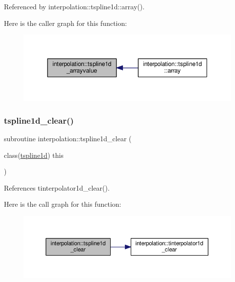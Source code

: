 Referenced by interpolation\+::tspline1d\+::array().

Here is the caller graph for this function\+:
\nopagebreak
\begin{figure}[H]
\begin{center}
\leavevmode
\includegraphics[width=344pt]{namespaceinterpolation_a1bb0d4fae1b5125618e2e9f67669bd3c_icgraph}
\end{center}
\end{figure}
\mbox{\label{namespaceinterpolation_ab31f5a781a449692250e4a0ab0ec432c}} 
\subsubsection{\texorpdfstring{tspline1d\+\_\+clear()}{tspline1d\_clear()}}
{\footnotesize\ttfamily subroutine interpolation\+::tspline1d\+\_\+clear (\begin{DoxyParamCaption}\item[{class(\mbox{\hyperlink{structinterpolation_1_1tspline1d}{tspline1d}})}]{this }\end{DoxyParamCaption})}



References tinterpolator1d\+\_\+clear().

Here is the call graph for this function\+:
\nopagebreak
\begin{figure}[H]
\begin{center}
\leavevmode
\includegraphics[width=350pt]{namespaceinterpolation_ab31f5a781a449692250e4a0ab0ec432c_cgraph}
\end{center}
\end{figure}
\mbox{\label{namespaceinterpolation_aec275a9deb7e4578d9d8c310b0dea093}} 
